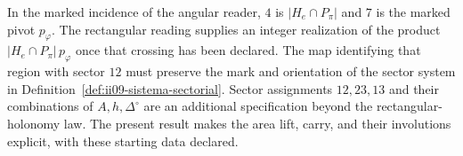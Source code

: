 In the marked incidence of the angular reader, $4$ is
$|H_e\cap P_\pi|$ and $7$ is the marked pivot $p_\varphi$.
The rectangular reading supplies an integer realization of the product
$|H_e\cap P_\pi|\,p_\varphi$ once that crossing has been declared. The
map identifying that region with sector $12$ must preserve
the mark and orientation of the sector system in
Definition~\ref{def:ii09-sistema-sectorial}. Sector assignments
$12,23,13$ and their combinations of $A,h,\Delta^\circ$
are an additional specification beyond the rectangular-holonomy law.
The present result makes the area lift, carry, and
their involutions explicit, with these starting data declared.
